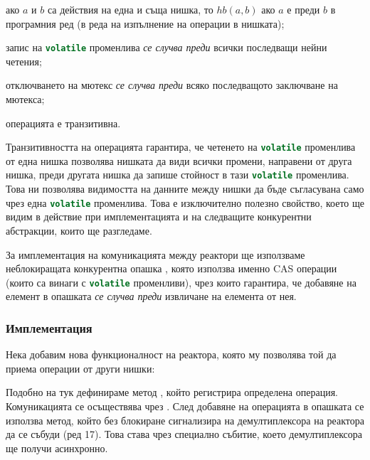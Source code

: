 \begin{itemize*}
  \item ако $a$ и $b$ са действия на една и съща нишка, то $hb(a, b)$ ако $a$ е преди $b$ в програмния ред (в реда на изпълнение на операции в нишката);
  \item запис на \lstinline[language=Java]{volatile} променлива \emph{се случва преди} всички последващи нейни четения;
  \item отключването на мютекс \emph{се случва преди} всяко последващото заключване на мютекса;
  \item операцията е транзитивна.
\end{itemize*}

Транзитивността на операцията гарантира, че четенето на \lstinline[language=Java]{volatile} променлива от една нишка позволява нишката да види всички промени, направени от друга нишка, преди другата нишка да запише стойност в тази \lstinline[language=Java]{volatile} променлива. Това ни позволява видимостта на данните между нишки да бъде съгласувана само чрез една \lstinline[language=Java]{volatile} променлива. Това е изключително полезно свойство, което ще видим в действие при имплементацията и на следващите конкурентни абстракции, които ще разгледаме.

За имплементация на комуникацията между реактори ще използваме неблокиращата конкурентна опашка , която използва именно CAS операции (които са винаги с \lstinline[language=Java]{volatile} променливи), чрез които гарантира, че добавяне на елемент в опашката \emph{се случва преди} извличане на елемента от нея.

\subsubsection{Имплементация}

Нека добавим нова функционалност на реактора, която му позволява той да приема операции от други нишки:



Подобно на  тук дефинираме метод , който регистрира определена операция. Комуникацията се осъществява чрез . След добавяне на операцията в опашката се използва метод, който без блокиране сигнализира на демултиплексора на реактора да се събуди (ред 17). Това става чрез специално събитие, което демултиплексора ще получи асинхронно.


